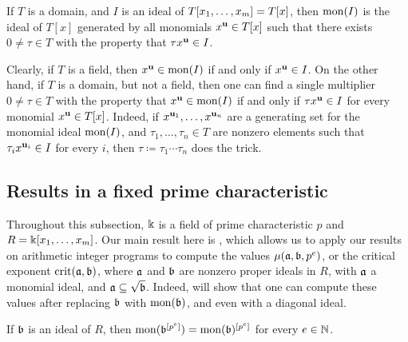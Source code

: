 \documentclass{amsart}
\begin{document}
\begin{definition}
\label{monomialization: D}
If $T$ is a domain, and $I$ is an ideal of $T[x_1, \ldots, x_m]=T[x]$, then $\operatorname{mon}(I)$ is the ideal of $T[x]$ generated by all monomials $x^{\mathbf{u}} \in T[x]$ such that there exists $0 \neq \tau \in T$ with the property that $\tau x^{\mathbf{u}} \in I$.%
\end{definition}


\begin{remark}
\label{single multiplier: R}
Clearly, if $T$ is a field, then $x^{\mathbf{u}} \in \operatorname{mon}(I)$ if and only if $x^{\mathbf{u}} \in I$.
On the other hand, if $T$ is a domain, but not a field, then one can find a single multiplier $0 \neq \tau \in T$ with the property that $x^{\mathbf{u}} \in \operatorname{mon}(I)$ if and only if $\tau x^{\mathbf{u}} \in I$ for every monomial $x^{\mathbf{u}} \in T[x]$.  Indeed, if $x^{\mathbf{u}_1}, \ldots, x^{\mathbf{u}_n}$ are a generating set for the monomial ideal $\operatorname{mon}(I)$, and $\tau_1, \ldots, \tau_n \in T$ are nonzero elements such that $\tau_i x^{\mathbf{u}_i} \in I$ for every $i$, then $\tau\coloneqq \tau_1 \cdots \tau_n$ does the trick.
\end{remark}

\subsection{Results in a fixed prime characteristic}
Throughout this subsection, $\Bbbk$ is a field of prime characteristic $p$ and $R=\Bbbk[x_1,\ldots,x_m]$.
Our main result here is , which allows us to apply our results on arithmetic integer programs to compute the values $\mu(\mathfrak{a},\mathfrak{b},p^e)$, or the critical exponent $\operatorname{crit}(\mathfrak{a}, \mathfrak{b})$, where $\mathfrak{a}$ and $\mathfrak{b}$ are nonzero proper ideals in $R$, with $\mathfrak{a}$ a monomial ideal, and $\mathfrak{a} \subseteq \sqrt {\mathfrak{b}}$.
Indeed,  will show that one can compute these values after replacing $\mathfrak{b}$ with $\operatorname{mon}(\mathfrak{b})$, and even with a diagonal ideal.

\begin{lemma} \label{frobenius-powers+mon-commute: L}
   If $\mathfrak{b}$ is an ideal of $R$,
   then $\operatorname{mon}(\mathfrak{b}^{[p^e]}) = \operatorname{mon}(\mathfrak{b})^{[p^e]}$ for every $e \in \mathbb{N}$.
\end{lemma}
\end{document}
